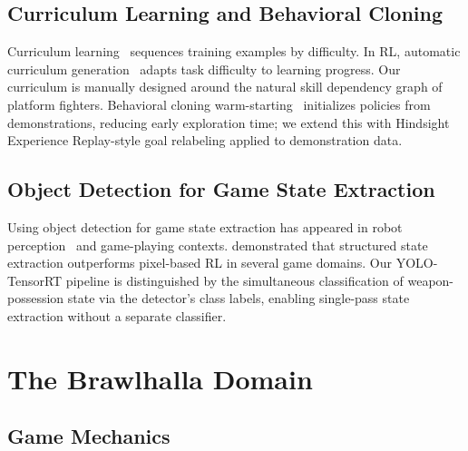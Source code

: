 \documentclass[11pt,a4paper]{article}
\begin{document}
\subsection{Curriculum Learning and Behavioral Cloning}
Curriculum learning~\cite{bengio2009curriculum} sequences training examples by difficulty.
In RL, automatic curriculum generation~\cite{florensa2018automatic,portelas2020teacher} adapts task difficulty to learning progress.
Our curriculum is manually designed around the natural skill dependency graph of platform fighters.
Behavioral cloning warm-starting~\cite{torabi2018behavioral,nair2018overcoming} initializes policies from demonstrations, reducing early exploration time; we extend this with Hindsight Experience Replay-style goal relabeling applied to demonstration data.

\subsection{Object Detection for Game State Extraction}
Using object detection for game state extraction has appeared in robot perception~\cite{redmon2016you} and game-playing contexts.
\citet{kanervisto2020playing} demonstrated that structured state extraction outperforms pixel-based RL in several game domains.
Our YOLO-TensorRT pipeline is distinguished by the simultaneous classification of weapon-possession state via the detector's class labels, enabling single-pass state extraction without a separate classifier.

\section{The Brawlhalla Domain}
\label{sec:domain}

\subsection{Game Mechanics}
\end{document}
